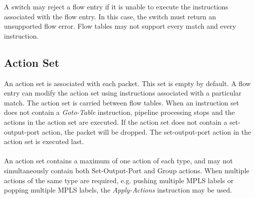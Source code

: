 \documentclass[10pt]{article}
\begin{document}
A switch may reject a flow entry if it is unable to execute the instructions associated with the flow entry. In this case, the switch must return an unsupported flow error.  Flow tables may not support every match and every instruction.

\subsection{Action Set}
\label{ft:actionset}
An action set is associated with each packet. This set is empty by default. A flow entry can modify the action set using instructions associated with a particular match. The action set is carried between flow tables. When an instruction set does not contain a \textit{Goto-Table} instruction, pipeline processing stops and the actions in the action set are executed. If the action set does not contain a set-output-port action, the packet will be dropped. The set-output-port action in the action set is executed last.
\\\\
An action set contains a maximum of one action of each type, and may not simultaneously contain both Set-Output-Port and Group actions. When multiple actions of the same type are required, e.g. pushing multiple MPLS labels or popping multiple MPLS labels, the \emph{Apply-Actions} instruction may be used.
\end{document}
